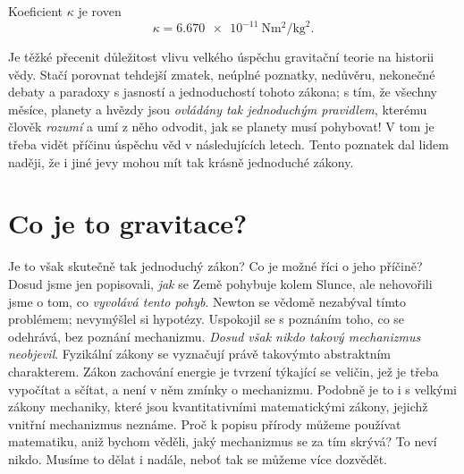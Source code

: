     Koeficient \(\kappa\) je roven 
    \begin{equation}\label{FYZ:eq095}
      \kappa = \SI{6.670e-11}{\N\square\meter\per\square\kg}.
    \end{equation}
    
    Je těžké přecenit důležitost vlivu velkého úspěchu gravitační teorie na historii vědy. Stačí 
    porovnat tehdejší zmatek, neúplné poznatky, nedůvěru, nekonečné debaty a paradoxy s jasností a 
    jednoduchostí tohoto zákona; s tím, že všechny měsíce, planety a hvězdy jsou \emph{ovládány tak 
    jednoduchým pravidlem}, kterému člověk \emph{rozumí} a umí z něho odvodit, jak se planety musí 
    pohybovat! V tom je třeba vidět příčinu úspěchu věd v následujících letech. Tento poznatek dal 
    lidem naději, že i jiné jevy mohou mít tak krásně jednoduché zákony.
    
  \section{Co je to gravitace?}
    Je to však skutečně tak jednoduchý zákon? Co je možné říci o jeho příčině? Dosud jsme jen 
    popisovali, \emph{jak} se Země pohybuje kolem Slunce, ale nehovořili jsme o tom, co 
    \emph{vyvolává tento pohyb}. Newton se vědomě nezabýval tímto problémem; nevymýšlel si 
    hypotézy. Uspokojil se s poznáním toho, co se odehrává, bez poznání mechanizmu. \emph{Dosud 
    však nikdo takový mechanizmus neobjevil}. Fyzikální zákony se vyznačují právě takovýmto 
    abstraktním charakterem. Zákon zachování energie je tvrzení týkající se veličin, jež je třeba 
    vypočítat a sčítat, a není v něm zmínky o mechanizmu. Podobně je to i s velkými zákony 
    mechaniky, které jsou kvantitativními matematickými zákony, jejichž vnitřní mechanizmus 
    neznáme. Proč k popisu přírody můžeme používat matematiku, aniž bychom věděli, jaký mechanizmus 
    se za tím skrývá? To neví nikdo. Musíme to dělat i nadále, neboť tak se můžeme více dozvědět.
    
